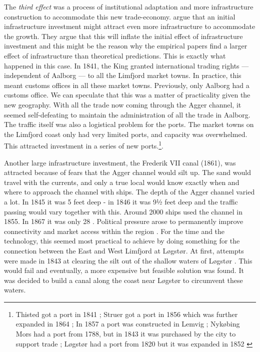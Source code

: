 \documentclass[11pt]{article}
\begin{document}
The \textit{third effect} was a process of institutional adaptation and more infrastructure construction to accommodate this new trade-economy. \cite{Redding2015} argue that an initial infrastructure investment might attract even more infrastructure to accommodate the growth. They argue that this will inflate the initial effect of infrastructure investment and this might be the reason why the empirical papers find a larger effect of infrastructure than theoretical predictions. This is exactly what happened in this case. In 1841, the King granted international trading rights — independent of Aalborg — to all the Limfjord market towns. In practice, this meant customs offices in all these market towns. Previously, only Aalborg had a customs office. We can speculate that this was a matter of practicality given the new geography. With all the trade now coming through the Agger channel, it seemed self-defeating to maintain the administration of all the trade in Aalborg. The traffic itself was also a logistical problem for the ports. The market towns on the Limfjord coast only had very limited ports, and capacity was overwhelmed. This attracted investment in a series of new ports.\footnote{Thisted got a port in 1841 \citep[p. 384-386]{Dioerup1842Thisted}; Struer got a port in 1856 which was further expanded in 1864 \citep[vol V, p. 467]{Trap3}; In 1857 a port was constructed in Lemvig \citep[vol V, p. 474]{Trap3}; Nykøbing Mors had a port from 1788, but in 1843 it was purchased by the city to support trade \citep[vol IV, p. 214]{Trap3}; Løgstør had a port from 1820 but it was expanded in 1852 \citep[vol IV, pp. 399-400]{Trap3}}.

Another large infrastructure investment, the Frederik VII canal (1861), was attracted because of fears that the Agger channel would silt up. The sand would travel with the currents, and only a true local would know exactly when and where to approach the channel with ships. The depth of the Agger channel varied a lot. In 1845 it was 5 feet deep - in 1846 it was 9½ feet deep \citep{Petersen1877} and the traffic passing would vary together with this. Around 2000 ships used the channel in 1855. In 1867 it was only 28 \citep{Ravn1993}. Political pressure arose to permanently improve connectivity and market access within the region \citep{petersen1853oplysende}. For the time and the technology, this seemed most practical to achieve by doing something for the connection between the East and West Limfjord at Løgstør. At first, attempts were made in 1843 at clearing the silt out of the shallow waters of Løgstør \citep[p. 311][p. 4]{Bergsoee1844, petersen1853oplysende}. This would fail and eventually, a more expensive but feasible solution was found. It was decided to build a canal along the coast near Løgstør to circumvent these waters.
\end{document}
